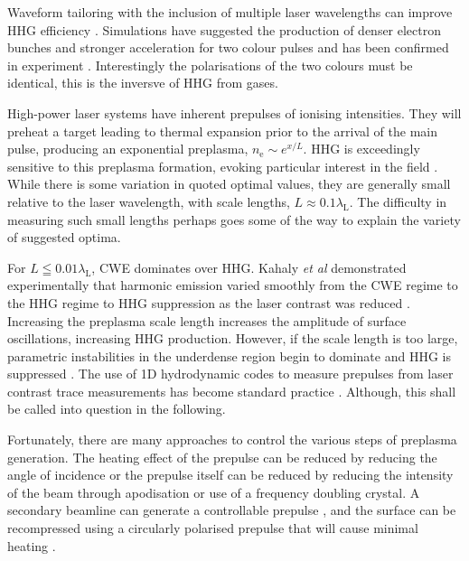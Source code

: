 Waveform tailoring with the inclusion of multiple laser wavelengths can improve HHG efficiency \cite{edwardsWaveformControlledRelativisticHighOrderHarmonic2016}. Simulations have suggested the production of denser electron bunches and stronger acceleration for two colour pulses \cite{edwardsEnhancedAttosecondBursts2014} and has been confirmed in experiment \cite{yeungExperimentalObservationAttosecond2017}. Interestingly the polarisations of the two colours must be identical, this is the inversve of HHG from gases.

High-power laser systems have inherent prepulses of ionising intensities. They will preheat a target leading to thermal expansion prior to the arrival of the main pulse, producing an exponential preplasma, $n_\mathrm{e} \sim e^{x/L}$. HHG is exceedingly sensitive to this preplasma formation, evoking particular interest in the field \cite{behmkeControllingSpacingAttosecond2011, rodelHarmonicGenerationRelativistic2012, dollarScalingHighorderHarmonic2013, kahalyDirectObservationDensityGradient2013, vincentiAchievingExtremeLight2019,behmkeControllingSpacingAttosecond2011}. While there is some variation in quoted optimal values, they are generally small relative to the laser wavelength, with scale lengths, $L \approx 0.1 \lambda_\mathrm{L}$. The difficulty in measuring such small lengths perhaps goes some of the way to explain the variety of suggested optima. 

For $L \leqq 0.01 \lambda_\mathrm{L}$, \ac{CWE} dominates over HHG. Kahaly \textit{et al} demonstrated experimentally that harmonic emission varied smoothly from the CWE regime to the HHG regime to HHG suppression as the laser contrast was reduced  \cite{kahalyDirectObservationDensityGradient2013}. Increasing the preplasma scale length increases the amplitude of surface oscillations, increasing HHG production. However, if the scale length is too large, parametric instabilities in the underdense region begin to dominate and HHG is suppressed \cite{dollarScalingHighorderHarmonic2013}. The use of 1D hydrodynamic codes to measure prepulses from laser contrast trace measurements has become standard practice \cite{behmkeControllingSpacingAttosecond2011, dollarScalingHighorderHarmonic2013, liExperimentalDemonstrationEfficient2022}. Although, this shall be called into question in the following.

Fortunately, there are many approaches to control the various steps of preplasma generation. The heating effect of the prepulse can be reduced by reducing the angle of incidence or the prepulse itself can be reduced by reducing the intensity of the beam through apodisation or use of a frequency doubling crystal. A secondary beamline can generate a controllable prepulse \cite{kahalyDirectObservationDensityGradient2013}, and the surface can be recompressed using a circularly polarised prepulse that will cause minimal heating \cite{liExperimentalDemonstrationEfficient2022}.

